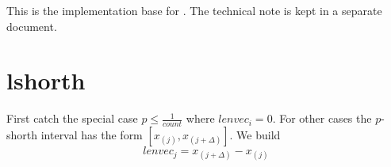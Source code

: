 %
%
%
%
%

This is the implementation base for .
The technical note is kept in a separate document.
\section{lshorth}
First catch the special case $p \leq \frac{1}{count}$ where $lenvec_i=0$. For other cases the $p$-shorth interval has the form $[x_{(j)}, x_{(j + \Delta)}]$. We build 
$$
lenvec_j = x_{(j+\Delta  )} -   x_{(j)}
$$

